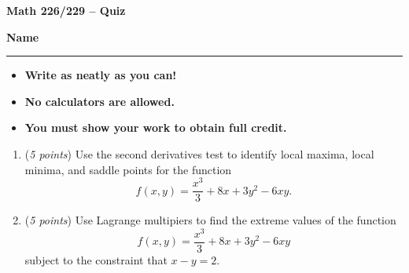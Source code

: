 \documentclass[12 pt]{article}
\begin{document}
  \begin{center}
    \textbf{\hfill Math 226/229 -- Quiz} \\
  \end{center}
  \medskip

  \noindent
  \textbf{Name}\ \rule{3.5in}{.4pt} \hfill
  \vspace{.1in}
  \hspace*{0.2in}
  \begin{itemize}
    \item \textbf{Write as neatly as you can!}
    \item \textbf{No calculators are allowed.}
    \item \textbf{You must show your work to obtain full credit.}
  \end{itemize}

	\medskip
  \noindent

  \begin{enumerate}
    \item (\textit{5 points})
    Use the second derivatives test to identify local maxima, local minima, and
    saddle points for the function \[
      f(x, y) = \frac{x^3}{3} + 8x + 3y^2 - 6xy.
    \]
		\vspace{2in}
		\item (\textit{5 points})
		Use Lagrange multipiers to find the extreme values of the function \[
      f(x, y) = \frac{x^3}{3} + 8x + 3y^2 - 6xy
    \]
    subject to the constraint that $x - y = 2$.
  \end{enumerate}
\end{document}
